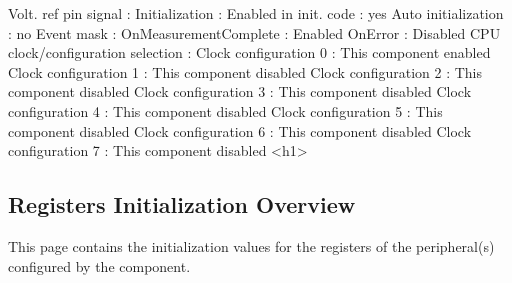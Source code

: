 \begin{DoxyCode}
                Volt. ref pin signal                       : 
            Initialization                                 : 
              Enabled in init. code                        : yes
              Auto initialization                          : no
              Event mask                                   : 
                OnMeasurementComplete                      : Enabled
                OnError                                    : Disabled
            CPU clock/configuration selection              : 
              Clock configuration 0                        : This component enabled
              Clock configuration 1                        : This component disabled
              Clock configuration 2                        : This component disabled
              Clock configuration 3                        : This component disabled
              Clock configuration 4                        : This component disabled
              Clock configuration 5                        : This component disabled
              Clock configuration 6                        : This component disabled
              Clock configuration 7                        : This component disabled
<h1>
\end{DoxyCode}
 \hypertarget{AdcLdd1_regs_overview}{}\subsection{Registers Initialization Overview}\label{AdcLdd1_regs_overview}
This page contains the initialization values for the registers of the peripheral(s) configured by the component. \tabulinesep=1mm
